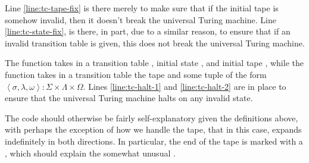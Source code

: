 Line \ref{line:tc-tape-fix} is there merely to make sure that if the initial
tape is somehow invalid, then it doesn't break the universal Turing machine.
Line \ref{line:tc-state-fix}, is there, in part, due to a similar reason, to
ensure that if an invalid transition table is given, this does not break the
universal Turing machine.

The function  takes in a transition table , initial state
, and initial tape , while the function 
takes in a transition table  the tape  and some tuple of the
form $\left\langle \sigma, \lambda, \omega \right\rangle : \Sigma \times
\Lambda \times \Omega$. Lines \ref{line:tc-halt-1} and \ref{line:tc-halt-2} are
in place to ensure that the universal Turing machine halts on any invalid
state.

The code should otherwise be fairly self-explanatory given the definitions
above, with perhaps the exception of how we handle the tape, that in this case,
expands indefinitely in both directions. In particular, the end of the tape is
marked with a , which should explain the somewhat unusual
.
